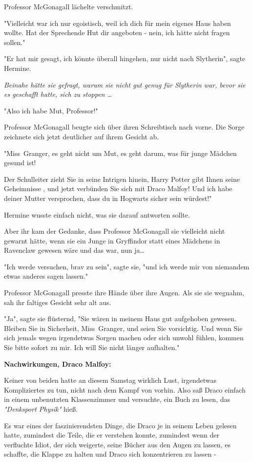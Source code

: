 {Professor McGonagall lächelte verschmitzt.

"Vielleicht war ich nur egoistisch, weil ich dich für mein eigenes Haus haben wollte. Hat der Sprechende Hut dir angeboten - nein, ich hätte nicht fragen sollen."

"Er hat mir gesagt, ich könnte überall hingehen, nur nicht nach Slytherin", sagte Hermine.

\emph{Beinahe hätte sie gefragt, warum sie nicht gut genug für Slytherin war, bevor sie es geschafft hatte, sich zu stoppen …}

"Also ich habe Mut, Professor!"

Professor McGonagall beugte sich über ihren Schreibtisch nach vorne. Die Sorge zeichnete sich jetzt deutlicher auf ihrem Gesicht ab.

"Miss~Granger, es geht nicht um Mut, es geht darum, was für junge Mädchen gesund ist!

Der Schulleiter zieht Sie in seine Intrigen hinein, Harry Potter gibt Ihnen seine Geheimnisse , und jetzt verbünden Sie sich mit Draco Malfoy! Und ich habe deiner Mutter versprochen, dass du in Hogwarts sicher sein würdest!"

Hermine wusste einfach nicht, was sie darauf antworten sollte.

Aber ihr kam der Gedanke, dass Professor McGonagall sie vielleicht nicht gewarnt hätte, wenn sie ein Junge in Gryffindor statt eines Mädchens in Ravenclaw gewesen wäre und das war, nun ja…

"Ich werde versuchen, brav zu sein", sagte sie, "und ich werde mir von niemandem etwas anderes sagen lassen."

Professor McGonagall presste ihre Hände über ihre Augen. Als sie sie wegnahm, sah ihr faltiges Gesicht sehr alt aus.

"Ja", sagte sie flüsternd, "Sie wären in meinem Haus gut aufgehoben gewesen. Bleiben Sie in Sicherheit, Miss~Granger, und seien Sie vorsichtig. Und wenn Sie sich jemals wegen irgendetwas Sorgen machen oder sich unwohl fühlen, kommen Sie bitte sofort zu mir. Ich will Sie nicht länger aufhalten."

\textbf{Nachwirkungen, Draco Malfoy:}

Keiner von beiden hatte an diesem Samstag wirklich Lust, irgendetwas Kompliziertes zu tun, nicht nach dem Kampf von vorhin. Also saß Draco einfach in einem unbenutzten Klassenzimmer und versuchte, ein Buch zu lesen, das \emph{"Denksport Physik"} hieß.

Es war eines der faszinierendsten Dinge, die Draco je in seinem Leben gelesen hatte, zumindest die Teile, die er verstehen konnte, zumindest wenn der verfluchte Idiot, der sich weigerte, seine Bücher aus den Augen zu lassen, es schaffte, die Klappe zu halten und Draco sich konzentrieren zu lassen -

}
